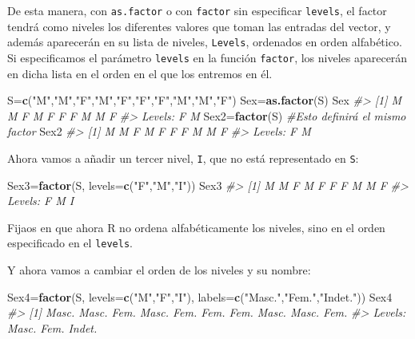 \documentclass[
]{book}
\newenvironment{Shaded}{\begin{snugshade}}{\end{snugshade}}
\newcommand{\CommentTok}[1]{\textcolor[rgb]{0.56,0.35,0.01}{\textit{#1}}}
\newcommand{\DataTypeTok}[1]{\textcolor[rgb]{0.13,0.29,0.53}{#1}}
\newcommand{\KeywordTok}[1]{\textcolor[rgb]{0.13,0.29,0.53}{\textbf{#1}}}
\newcommand{\NormalTok}[1]{#1}
\newcommand{\StringTok}[1]{\textcolor[rgb]{0.31,0.60,0.02}{#1}}
\theoremstyle{definition}
\theoremstyle{definition}
\theoremstyle{definition}
\theoremstyle{remark}
\begin{document}
De esta manera, con \texttt{as.factor} o con \texttt{factor} sin especificar \texttt{levels}, el factor tendrá como niveles los diferentes valores que toman las entradas del vector, y además aparecerán en su lista de niveles, \texttt{Levels}, ordenados en orden alfabético. Si especificamos el parámetro \texttt{levels} en la función \texttt{factor}, los niveles aparecerán en dicha lista en el orden en el que los entremos en él.

\begin{Shaded}
\begin{Highlighting}[]
\NormalTok{S=}\KeywordTok{c}\NormalTok{(}\StringTok{"M"}\NormalTok{,}\StringTok{"M"}\NormalTok{,}\StringTok{"F"}\NormalTok{,}\StringTok{"M"}\NormalTok{,}\StringTok{"F"}\NormalTok{,}\StringTok{"F"}\NormalTok{,}\StringTok{"F"}\NormalTok{,}\StringTok{"M"}\NormalTok{,}\StringTok{"M"}\NormalTok{,}\StringTok{"F"}\NormalTok{)}
\NormalTok{Sex=}\KeywordTok{as.factor}\NormalTok{(S)}
\NormalTok{Sex}
\CommentTok{\#\textgreater{}  [1] M M F M F F F M M F}
\CommentTok{\#\textgreater{} Levels: F M}
\NormalTok{Sex2=}\KeywordTok{factor}\NormalTok{(S)   }\CommentTok{\#Esto definirá el mismo factor}
\NormalTok{Sex2}
\CommentTok{\#\textgreater{}  [1] M M F M F F F M M F}
\CommentTok{\#\textgreater{} Levels: F M}
\end{Highlighting}
\end{Shaded}

Ahora vamos a añadir un tercer nivel, \texttt{I}, que no está representado en \texttt{S}:

\begin{Shaded}
\begin{Highlighting}[]
\NormalTok{Sex3=}\KeywordTok{factor}\NormalTok{(S, }\DataTypeTok{levels=}\KeywordTok{c}\NormalTok{(}\StringTok{"F"}\NormalTok{,}\StringTok{"M"}\NormalTok{,}\StringTok{"I"}\NormalTok{))}
\NormalTok{Sex3}
\CommentTok{\#\textgreater{}  [1] M M F M F F F M M F}
\CommentTok{\#\textgreater{} Levels: F M I}
\end{Highlighting}
\end{Shaded}

Fijaos en que ahora R no ordena alfabéticamente los niveles, sino en el orden especificado en el \texttt{levels}.

Y ahora vamos a cambiar el orden de los niveles y su nombre:

\begin{Shaded}
\begin{Highlighting}[]
\NormalTok{Sex4=}\KeywordTok{factor}\NormalTok{(S, }\DataTypeTok{levels=}\KeywordTok{c}\NormalTok{(}\StringTok{"M"}\NormalTok{,}\StringTok{"F"}\NormalTok{,}\StringTok{"I"}\NormalTok{), }\DataTypeTok{labels=}\KeywordTok{c}\NormalTok{(}\StringTok{"Masc."}\NormalTok{,}\StringTok{"Fem."}\NormalTok{,}\StringTok{"Indet."}\NormalTok{))}
\NormalTok{Sex4}
\CommentTok{\#\textgreater{}  [1] Masc. Masc. Fem.  Masc. Fem.  Fem.  Fem.  Masc. Masc. Fem. }
\CommentTok{\#\textgreater{} Levels: Masc. Fem. Indet.}
\end{Highlighting}
\end{Shaded}
\end{document}

